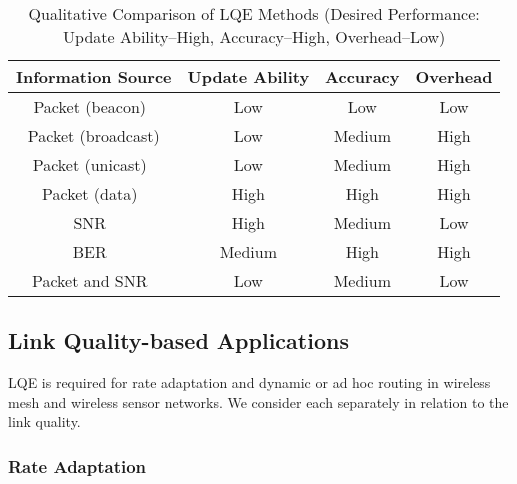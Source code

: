 \documentclass[11pt,draftclsnofoot,journal,onecolumn]{IEEEtran}
\begin{document}
\begin{table}
\centering
\caption{Qualitative Comparison of LQE Methods (Desired Performance: Update Ability--High, Accuracy--High, Overhead--Low)}
\label{LQE_comparision}
\begin{tabular}{c|c|c|c}
  \hline
  Information Source & Update Ability & Accuracy & Overhead \\
  \hline\hline
  Packet (beacon)~\cite{Couto_WN_2005,BicketMobicom2005} & Low & Low & Low \\
  \hline
  Packet (broadcast) & Low & Medium & High \\
  \hline
  Packet (unicast)~\cite{Kim2006,Kim_Ton_2009,alizai_2008_FGSN,xu_2006_Percom} & Low & Medium & High \\
  \hline
  Packet (data)~\cite{zhang_2009_tmc} & High & High & High \\
  \hline
  SNR~\cite{verma_2008_Wimesh,senel_2007_globecom,Judd_Mobicom_2007, Zhou_Pernets_2007, Zhou_VTC_2009,Zhang_Infocom_2008} & High & Medium & Low \\
  \hline
  BER~\cite{breed_2003_ber_HFE,koksal_2006_JSAC} & Medium & High & High \\
  \hline
  Packet and SNR~\cite{zhou_2009_CCNC} & Low & Medium & Low \\
  \hline
\end{tabular}
\end{table}

\subsection{Link Quality-based Applications}
\label{sec:lqe_applications}

LQE is required for rate adaptation and dynamic or ad hoc routing in wireless mesh and wireless sensor networks. We consider each separately in relation to the link quality.

\subsubsection{Rate Adaptation}
\end{document}
